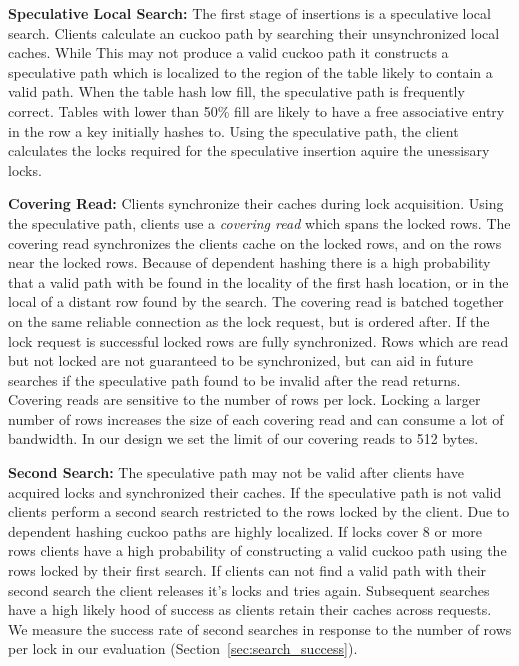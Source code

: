 \textbf{Speculative Local Search:} The first stage of
insertions is a speculative local search. Clients calculate
an cuckoo path by searching their unsynchronized local
caches. While This may not produce a valid cuckoo path it
constructs a speculative path which is localized to the
region of the table likely to contain a valid path. When the
table hash low fill, the speculative path is frequently
correct. Tables with lower than 50\% fill are likely to have
a free associative entry in the row a key initially hashes
to.  Using the speculative path, the client calculates the
locks required for the speculative insertion aquire the
unessisary locks.

\textbf{Covering Read:} Clients synchronize their caches
during lock acquisition.  Using the speculative path,
clients use a \textit{covering read} which spans the locked
rows. The covering read synchronizes the clients cache on
the locked rows, and on the rows near the locked rows.
Because of dependent hashing there is a high probability
that a valid path with be found in the locality of the first
hash location, or in the local of a distant row found by the
search. The covering read is batched together on the same
reliable connection as the lock request, but is ordered
after. If the lock request is successful locked rows are
fully synchronized. Rows which are read but not locked are
not guaranteed to be synchronized, but can aid in future
searches if the speculative path found to be invalid after
the read returns. Covering reads are sensitive to the number
of rows per lock. Locking a larger number of rows increases
the size of each covering read and can consume a lot of
bandwidth. In our design we set the limit of our covering
reads to 512 bytes.

\textbf{Second Search:} The speculative path may not be
valid after clients have acquired locks and synchronized
their caches. If the speculative path is not valid clients
perform a second search restricted to the rows locked by the
client. Due to dependent hashing cuckoo paths are highly
localized. If locks cover 8 or more rows clients have a high
probability of constructing a valid cuckoo path using the
rows locked by their first search. If clients can not find a
valid path with their second search the client releases it's
locks and tries again. Subsequent searches have a high
likely hood of success as clients retain their caches across
requests. We measure the success rate of second searches in
response to the number of rows per lock in our evaluation
(Section~\ref{sec:search_success}).

